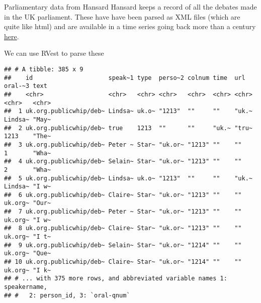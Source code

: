 \documentclass[
  10pt,
  ignorenonframetext,
  aspectratio=169]{beamer}
\newenvironment{Shaded}{\begin{snugshade}}{\end{snugshade}}
\newcommand{\FunctionTok}[1]{\textcolor[rgb]{0.94,0.94,0.56}{#1}}
\newcommand{\NormalTok}[1]{\textcolor[rgb]{0.80,0.80,0.80}{#1}}
\newcommand{\OtherTok}[1]{\textcolor[rgb]{0.94,0.94,0.56}{#1}}
\newcommand{\SpecialCharTok}[1]{\textcolor[rgb]{0.86,0.64,0.64}{#1}}
\newcommand{\StringTok}[1]{\textcolor[rgb]{0.80,0.58,0.58}{#1}}
\begin{document}
\begin{frame}[fragile]{Parliamentary data from Hansard}
\protect\hypertarget{parliamentary-data-from-hansard}{}
Hansard keeps a record of all the debates made in the UK parliament.
These have have been parsed as XML files (which are quite like html) and
are available in a time series going back more than a century
\href{https://parser.theyworkforyou.com/hansard.html}{here}.

We can use RVest to parse these

\scriptsize

\begin{Shaded}
\end{Shaded}

\begin{verbatim}
## # A tibble: 385 x 9
##    id                     speak~1 type  perso~2 colnum time  url   oral-~3 text 
##    <chr>                  <chr>   <chr> <chr>   <chr>  <chr> <chr> <chr>   <chr>
##  1 uk.org.publicwhip/deb~ Lindsa~ uk.o~ "1213"  ""     ""    "uk.~ Lindsa~ "May~
##  2 uk.org.publicwhip/deb~ true    1213  ""      ""     "uk.~ "tru~ 1213    "The~
##  3 uk.org.publicwhip/deb~ Peter ~ Star~ "uk.or~ "1213" ""    ""    1       "Wha~
##  4 uk.org.publicwhip/deb~ Selain~ Star~ "uk.or~ "1213" ""    ""    2       "Wha~
##  5 uk.org.publicwhip/deb~ Lindsa~ uk.o~ "1213"  ""     ""    "uk.~ Lindsa~ "I w~
##  6 uk.org.publicwhip/deb~ Claire~ Star~ "uk.or~ "1213" ""    ""    uk.org~ "Our~
##  7 uk.org.publicwhip/deb~ Peter ~ Star~ "uk.or~ "1213" ""    ""    uk.org~ "I w~
##  8 uk.org.publicwhip/deb~ Claire~ Star~ "uk.or~ "1213" ""    ""    uk.org~ "I t~
##  9 uk.org.publicwhip/deb~ Selain~ Star~ "uk.or~ "1214" ""    ""    uk.org~ "Que~
## 10 uk.org.publicwhip/deb~ Claire~ Star~ "uk.or~ "1214" ""    ""    uk.org~ "I k~
## # ... with 375 more rows, and abbreviated variable names 1: speakername,
## #   2: person_id, 3: `oral-qnum`
\end{verbatim}
\end{frame}
\end{document}
